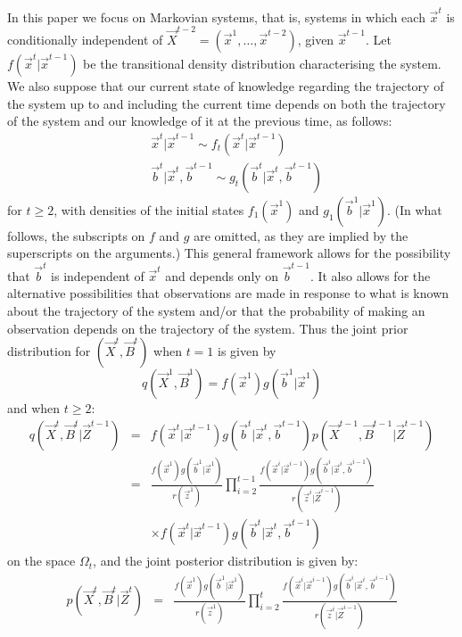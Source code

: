 In this paper we focus on Markovian systems, that is, systems in which each $\vec{x}^t$ is conditionally independent of $\vec{X}^{t-2} = (\vec{x}^1, \ldots,\vec{x}^{t-2})$, given $\vec{x}^{t-1}$. Let $f(\vec{x}^t | \vec{x}^{t-1})$ be the transitional density distribution characterising the system. We also suppose that our current state of knowledge regarding the trajectory of the system up to and including the current time depends on both the trajectory of the system and our knowledge of it at the previous time, as follows:
\begin{align*}
    &\vec{x}^t | \vec{x}^{t-1} \sim f_t(\vec{x}^t | \vec{x}^{t-1})\\
    &\vec{b}^t | \vec{x}^t, \vec{b}^{t-1} \sim g_t(\vec{b}^t | \vec{x}^t, \vec{b}^{t-1})
\end{align*}
for $t \geq 2$, with densities of the initial states $f_1(\vec{x}^1)$ and $g_1(\vec{b}^1 | \vec{x}^1)$. (In what follows, the subscripts on $f$ and $g$ are omitted, as they are implied by the superscripts on the arguments.)
This general framework allows for the possibility that $\vec{b}^t$ is independent of $\vec{x}^{t}$ and depends only on $\vec{b}^{t-1}$. It also allows for the alternative possibilities that observations are made in response to what is known about the trajectory of the system and/or that the probability of making an observation depends on the trajectory of the system. Thus the joint prior distribution for $(\vec{X}^t,\vec{B}^t)$ when $t=1$ is given by 
\[
q(\vec{X}^1,\vec{B}^1) = f(\vec{x}^1)g(\vec{b}^1 | \vec{x}^1)
\]
and when $t \geq 2$: 
\begin{eqnarray*}
    q(\vec{X}^t, \vec{B}^t | \vec{Z}^{t-1}) &=& f(\vec{x}^t | \vec{x}^{t-1}) g(\vec{b}^t | \vec{x}^t, \vec{b}^{t-1}) p(\vec{X}^{t-1}, \vec{B}^{t-1} | \vec{Z}^{t-1}) \\
& = & \frac{f(\vec{x}^1)g(\vec{b}^1 | \vec{x}^1)}{r(\vec{z}^1)} \prod_{i=2}^{t-1} \frac{f(\vec{x}^i | \vec{x}^{i-1}) g(\vec{b}^i | \vec{x}^i, \vec{b}^{i-1})}{r(\vec{z}^i | \vec{Z}^{i-1})} \\
& & \times f(\vec{x}^t | \vec{x}^{t-1}) g(\vec{b}^t | \vec{x}^t, \vec{b}^{t-1})
\end{eqnarray*}
on the space $\Omega_t$, and the joint posterior distribution is given by:
\begin{eqnarray*}
    p(\vec{X}^t, \vec{B}^t | \vec{Z}^t) 
& = & \frac{f(\vec{x}^1)g(\vec{b}^1 | \vec{x}^1)}{r(\vec{z}^1)} \prod_{i=2}^t \frac{f(\vec{x}^i | \vec{x}^{i-1}) g(\vec{b}^i | \vec{x}^i , \vec{b}^{i-1})}{r(\vec{z}^i | \vec{Z}^{i-1})} 
\end{eqnarray*}
